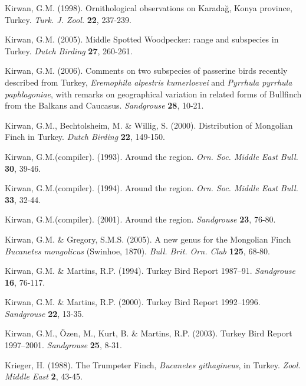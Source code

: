 \documentclass[
  10.5pt,
  a4paper,
  DIV=11,
  numbers=noendperiod,
  twocolumn]{scrreprt}
\newlength{\cslhangindent}
\newenvironment{CSLReferences}[2] %
 {\begin{list}{}{%
  \setlength{\itemindent}{0pt}
  \setlength{\leftmargin}{0pt}
  \setlength{\parsep}{0pt}
  \ifodd #1
   \setlength{\leftmargin}{\cslhangindent}
   \setlength{\itemindent}{-1\cslhangindent}
  \fi
  \setlength{\itemsep}{#2\baselineskip}}}
 {\end{list}}
\begin{document}
\begin{CSLReferences}{1}{1}
Kirwan, G.M. (1998). {Ornithological observations on Karadağ, Konya
province, Turkey}. \emph{Turk. J. Zool.} \textbf{22}, 237-239.

Kirwan, G.M. (2005). {Middle Spotted Woodpecker: range and subspecies in
Turkey}. \emph{Dutch Birding} \textbf{27}, 260-261.

Kirwan, G.M. (2006). {Comments on two subspecies of passerine birds
recently described from Turkey, \emph{Eremophila alpestris kumerloevei}
and \emph{Pyrrhula pyrrhula paphlagoniae}, with remarks on geographical
variation in related forms of Bullfinch from the Balkans and Caucasus}.
\emph{Sandgrouse} \textbf{28}, 10-21.

Kirwan, G.M., Bechtolsheim, M. \& Willig, S. (2000). {Distribution of
Mongolian Finch in Turkey}. \emph{Dutch Birding} \textbf{22}, 149-150.

Kirwan, G.M.(compiler). (1993). {Around the region}. \emph{Orn. Soc.
Middle East Bull.} \textbf{30}, 39-46.

Kirwan, G.M.(compiler). (1994). {Around the region}. \emph{Orn. Soc.
Middle East Bull.} \textbf{33}, 32-44.

Kirwan, G.M.(compiler). (2001). {Around the region}. \emph{Sandgrouse}
\textbf{23}, 76-80.

Kirwan, G.M. \& Gregory, S.M.S. (2005). {A new genus for the Mongolian
Finch \emph{Bucanetes mongolicus} (Swinhoe, 1870)}. \emph{Bull. Brit.
Orn. Club} \textbf{125}, 68-80.

Kirwan, G.M. \& Martins, R.P. (1994). {Turkey Bird Report 1987--91}.
\emph{Sandgrouse} \textbf{16}, 76-117.

Kirwan, G.M. \& Martins, R.P. (2000). {Turkey Bird Report 1992--1996}.
\emph{Sandgrouse} \textbf{22}, 13-35.

Kirwan, G.M., Özen, M., Kurt, B. \& Martins, R.P. (2003). {Turkey Bird
Report 1997--2001}. \emph{Sandgrouse} \textbf{25}, 8-31.

Krieger, H. (1988). {The Trumpeter Finch, \emph{Bucanetes githagineus},
in Turkey}. \emph{Zool. Middle East} \textbf{2}, 43-45.


\end{CSLReferences}
\end{document}
